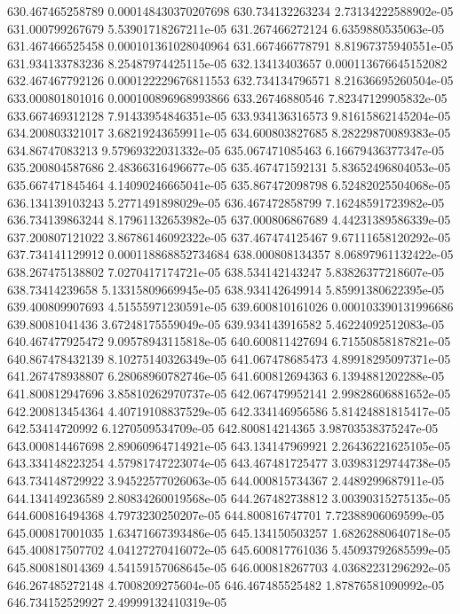 {630.467465258789 0.000148430370207698
630.734132263234 2.73134222588902e-05
631.000799267679 5.53901718267211e-05
631.267466272124 6.6359880535063e-05
631.467466525458 0.000101361028040964
631.667466778791 8.81967375940551e-05
631.934133783236 8.25487974425115e-05
632.13413403657 0.000113676645152082
632.467467792126 0.000122229676811553
632.734134796571 8.21636695260504e-05
633.000801801016 0.000100896968993866
633.26746880546 7.82347129905832e-05
633.667469312128 7.91433954846351e-05
633.934136316573 9.81615862145204e-05
634.200803321017 3.68219243659911e-05
634.600803827685 8.28229870089383e-05
634.86747083213 9.57969322031332e-05
635.067471085463 6.16679436377347e-05
635.200804587686 2.48366316496677e-05
635.467471592131 5.83652496804053e-05
635.667471845464 4.14090246665041e-05
635.867472098798 6.52482025504068e-05
636.134139103243 5.2771491898029e-05
636.467472858799 7.16248591723982e-05
636.734139863244 8.17961132653982e-05
637.000806867689 4.44231389586339e-05
637.200807121022 3.86786146092322e-05
637.467474125467 9.67111658120292e-05
637.734141129912 0.000118868852734684
638.000808134357 8.06897961132422e-05
638.267475138802 7.0270417174721e-05
638.534142143247 5.83826377218607e-05
638.73414239658 5.13315809669945e-05
638.934142649914 5.85991380622395e-05
639.400809907693 4.51555971230591e-05
639.600810161026 0.000103390131996686
639.80081041436 3.67248175559049e-05
639.934143916582 5.46224092512083e-05
640.467477925472 9.09578943115818e-05
640.600811427694 6.71550858187821e-05
640.867478432139 8.10275140326349e-05
641.067478685473 4.89918295097371e-05
641.267478938807 6.28068960782746e-05
641.600812694363 6.1394881202288e-05
641.800812947696 3.85810262970737e-05
642.067479952141 2.99828606881652e-05
642.200813454364 4.40719108837529e-05
642.334146956586 5.81424881815417e-05
642.53414720992 6.1270509534709e-05
642.800814214365 3.98703538375247e-05
643.000814467698 2.89060964714921e-05
643.134147969921 2.26436221625105e-05
643.334148223254 4.57981747223074e-05
643.467481725477 3.03983129744738e-05
643.734148729922 3.94522577026063e-05
644.000815734367 2.4489299687911e-05
644.134149236589 2.80834260019568e-05
644.267482738812 3.00390315275135e-05
644.600816494368 4.7973230250207e-05
644.800816747701 7.72388906069599e-05
645.000817001035 1.63471667393486e-05
645.134150503257 1.68262880640718e-05
645.400817507702 4.04127270416072e-05
645.600817761036 5.45093792685599e-05
645.800818014369 4.54159157068645e-05
646.000818267703 4.03682231296292e-05
646.267485272148 4.7008209275604e-05
646.467485525482 1.87876581090992e-05
646.734152529927 2.49999132410319e-05
}
